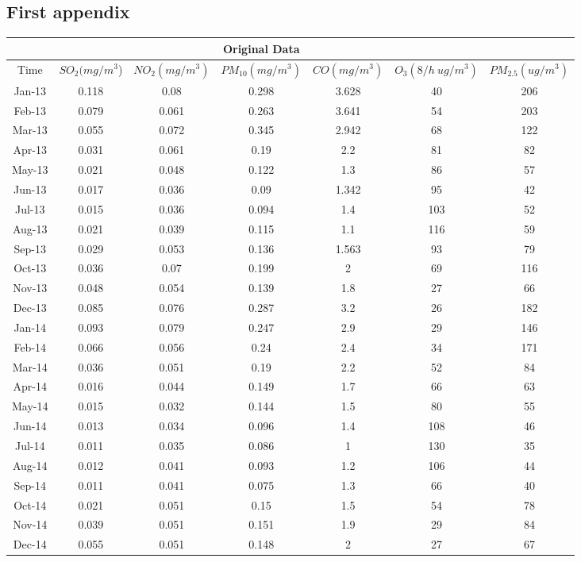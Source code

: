\documentclass[a4paper,11pt]{article}
\begin{document}
\begin{appendices}
% 
% 
\section{First appendix}



\begin{longtable}{ccccccc}
 &&&Original Data&&&\\
 \hline
Time  & $SO_2(mg/m^3 $)&$NO_2(mg/m^3) $& $PM_10(mg/m^3) $& $CO (mg/m^3) $&$O_3(8/h~ug/m^3)$& $PM_2.5(ug/m^3)$ \\
\hline
\endhead
Jan-13 & 0.118 & 0.08  & 0.298 & 3.628 & 40    & 206 \\
    Feb-13 & 0.079 & 0.061 & 0.263 & 3.641 & 54    & 203 \\
    Mar-13 & 0.055 & 0.072 & 0.345 & 2.942 & 68    & 122 \\
    Apr-13 & 0.031 & 0.061 & 0.19  & 2.2   & 81    & 82 \\
    May-13 & 0.021 & 0.048 & 0.122 & 1.3   & 86    & 57 \\
    Jun-13 & 0.017 & 0.036 & 0.09  & 1.342 & 95    & 42 \\
    Jul-13 & 0.015 & 0.036 & 0.094 & 1.4   & 103   & 52 \\
    Aug-13 & 0.021 & 0.039 & 0.115 & 1.1   & 116   & 59 \\
    Sep-13 & 0.029 & 0.053 & 0.136 & 1.563 & 93    & 79 \\
    Oct-13 & 0.036 & 0.07  & 0.199 & 2    & 69    & 116 \\
    Nov-13 & 0.048 & 0.054 & 0.139 & 1.8  & 27    & 66 \\
    Dec-13 & 0.085 & 0.076 & 0.287 & 3.2  & 26    & 182 \\
    Jan-14 & 0.093 & 0.079 & 0.247 & 2.9  & 29    & 146 \\
    Feb-14 & 0.066 & 0.056 & 0.24  & 2.4  & 34    & 171 \\
    Mar-14 & 0.036 & 0.051 & 0.19  & 2.2  & 52    & 84 \\
    Apr-14 & 0.016 & 0.044 & 0.149 & 1.7  & 66    & 63 \\
    May-14 & 0.015 & 0.032 & 0.144 & 1.5  & 80    & 55 \\
    Jun-14 & 0.013 & 0.034 & 0.096 & 1.4  & 108   & 46 \\
    Jul-14 & 0.011 & 0.035 & 0.086 & 1   & 130  & 35 \\
    Aug-14 & 0.012 & 0.041 & 0.093 & 1.2  & 106   & 44 \\
    Sep-14 & 0.011 & 0.041 & 0.075 & 1.3  & 66    & 40 \\
    Oct-14 & 0.021 & 0.051 & 0.15  & 1.5  & 54    & 78 \\
    Nov-14 & 0.039 & 0.051 & 0.151 & 1.9  & 29    & 84 \\
    Dec-14 & 0.055 & 0.051 & 0.148 & 2   & 27    & 67 \\
\end{longtable}






\end{appendices}
\end{document}
